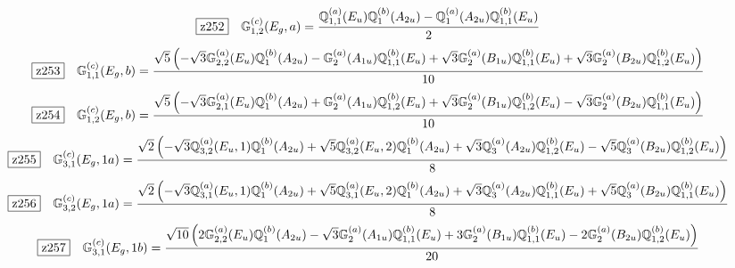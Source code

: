 \documentclass[fleqn,10pt,landscape]{jsarticle}
\begin{document}
\begin{dmath*}
\hspace*{3mm}\fbox{z252}\quad \mathbb{G}_{1,2}^{(c)}(E_{g},a)=\frac{\mathbb{Q}_{1,1}^{(a)}(E_{u}) \mathbb{Q}_{1}^{(b)}(A_{2u}) - \mathbb{Q}_{1}^{(a)}(A_{2u}) \mathbb{Q}_{1,1}^{(b)}(E_{u})}{2}
\end{dmath*}
\begin{dmath*}
\hspace*{3mm}\fbox{z253}\quad \mathbb{G}_{1,1}^{(c)}(E_{g},b)=\frac{\sqrt{5} \left(- \sqrt{3} \mathbb{G}_{2,2}^{(a)}(E_{u}) \mathbb{Q}_{1}^{(b)}(A_{2u}) - \mathbb{G}_{2}^{(a)}(A_{1u}) \mathbb{Q}_{1,1}^{(b)}(E_{u}) + \sqrt{3} \mathbb{G}_{2}^{(a)}(B_{1u}) \mathbb{Q}_{1,1}^{(b)}(E_{u}) + \sqrt{3} \mathbb{G}_{2}^{(a)}(B_{2u}) \mathbb{Q}_{1,2}^{(b)}(E_{u})\right)}{10}
\end{dmath*}
\begin{dmath*}
\hspace*{3mm}\fbox{z254}\quad \mathbb{G}_{1,2}^{(c)}(E_{g},b)=\frac{\sqrt{5} \left(- \sqrt{3} \mathbb{G}_{2,1}^{(a)}(E_{u}) \mathbb{Q}_{1}^{(b)}(A_{2u}) + \mathbb{G}_{2}^{(a)}(A_{1u}) \mathbb{Q}_{1,2}^{(b)}(E_{u}) + \sqrt{3} \mathbb{G}_{2}^{(a)}(B_{1u}) \mathbb{Q}_{1,2}^{(b)}(E_{u}) - \sqrt{3} \mathbb{G}_{2}^{(a)}(B_{2u}) \mathbb{Q}_{1,1}^{(b)}(E_{u})\right)}{10}
\end{dmath*}
\begin{dmath*}
\hspace*{3mm}\fbox{z255}\quad \mathbb{G}_{3,1}^{(c)}(E_{g},1a)=\frac{\sqrt{2} \left(- \sqrt{3} \mathbb{Q}_{3,2}^{(a)}(E_{u},1) \mathbb{Q}_{1}^{(b)}(A_{2u}) + \sqrt{5} \mathbb{Q}_{3,2}^{(a)}(E_{u},2) \mathbb{Q}_{1}^{(b)}(A_{2u}) + \sqrt{3} \mathbb{Q}_{3}^{(a)}(A_{2u}) \mathbb{Q}_{1,2}^{(b)}(E_{u}) - \sqrt{5} \mathbb{Q}_{3}^{(a)}(B_{2u}) \mathbb{Q}_{1,2}^{(b)}(E_{u})\right)}{8}
\end{dmath*}
\begin{dmath*}
\hspace*{3mm}\fbox{z256}\quad \mathbb{G}_{3,2}^{(c)}(E_{g},1a)=\frac{\sqrt{2} \left(- \sqrt{3} \mathbb{Q}_{3,1}^{(a)}(E_{u},1) \mathbb{Q}_{1}^{(b)}(A_{2u}) + \sqrt{5} \mathbb{Q}_{3,1}^{(a)}(E_{u},2) \mathbb{Q}_{1}^{(b)}(A_{2u}) + \sqrt{3} \mathbb{Q}_{3}^{(a)}(A_{2u}) \mathbb{Q}_{1,1}^{(b)}(E_{u}) + \sqrt{5} \mathbb{Q}_{3}^{(a)}(B_{2u}) \mathbb{Q}_{1,1}^{(b)}(E_{u})\right)}{8}
\end{dmath*}
\begin{dmath*}
\hspace*{3mm}\fbox{z257}\quad \mathbb{G}_{3,1}^{(c)}(E_{g},1b)=\frac{\sqrt{10} \left(2 \mathbb{G}_{2,2}^{(a)}(E_{u}) \mathbb{Q}_{1}^{(b)}(A_{2u}) - \sqrt{3} \mathbb{G}_{2}^{(a)}(A_{1u}) \mathbb{Q}_{1,1}^{(b)}(E_{u}) + 3 \mathbb{G}_{2}^{(a)}(B_{1u}) \mathbb{Q}_{1,1}^{(b)}(E_{u}) - 2 \mathbb{G}_{2}^{(a)}(B_{2u}) \mathbb{Q}_{1,2}^{(b)}(E_{u})\right)}{20}
\end{dmath*}
\end{document}
